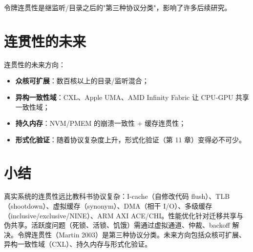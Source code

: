 令牌连贯性是继监听/目录之后的"第三种协议分类"，影响了许多后续研究。

\section{连贯性的未来}

连贯性的未来方向：

\begin{itemize}
\item \textbf{众核可扩展}：数百核以上的目录/监听混合；
\item \textbf{异构一致性域}：CXL、Apple UMA、AMD Infinity Fabric 让 CPU-GPU 共享一致性域；
\item \textbf{持久内存}：NVM/PMEM 的崩溃一致性 + 缓存连贯性；
\item \textbf{形式化验证}：随着协议复杂度上升，形式化验证（第 11 章）变得必不可少。
\end{itemize}


\section{小结}

真实系统的连贯性远比教科书协议复杂：I-cache（自修改代码 flush）、TLB（shootdown）、虚拟缓存（synonym）、DMA（相干 I/O）、多级缓存（inclusive/exclusive/NINE）、ARM AXI ACE/CHI。性能优化针对迁移共享与伪共享。活跃度问题（死锁、活锁、饥饿）需通过虚拟通道、仲裁、backoff 解决。令牌连贯性（Martin 2003）是第三种协议分类。未来方向包括众核可扩展、异构一致性域（CXL）、持久内存与形式化验证。

